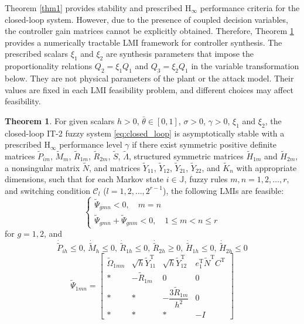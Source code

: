 \documentclass[preprint,review,fleqn,sort&compress,3p]{elsarticle}
\theoremstyle{definition} %
\theoremstyle{definition}%
\newtheorem{thm}{Theorem}[section]
\begin{document}
Theorem \ref{thm1} provides stability and prescribed $\mathrm{H}_{\infty}$ performance criteria for the closed-loop system.
However, due to the presence of coupled decision variables, the controller gain matrices cannot be explicitly obtained. Therefore, Theorem \ref{thm2} provides a numerically tractable LMI framework for controller synthesis.
The prescribed scalars $\xi_1$ and $\xi_2$ are synthesis parameters that impose the proportionality relations $Q_2=\xi_1Q_1$ and $Q_3=\xi_2Q_1$ in the variable transformation below. They are not physical parameters of the plant or the attack model. Their values are fixed in each LMI feasibility problem, and different choices may affect feasibility.
\begin{thm}\label{thm2}
 For given scalars $h > 0$, $\bar{\theta} \in [0,1]$, $\sigma > 0$, $\gamma > 0$, $\xi_1$ and $\xi_2$, the closed-loop IT-2 fuzzy system \eqref{eq:closed_loop} is asymptotically stable with a prescribed $\mathrm{H}_\infty$ performance level $\gamma$ if there exist symmetric positive definite matrices $\tilde{P}_{im}$, $\tilde{M}_{m}$, $\tilde{R}_{1m}$, $\tilde{R}_{2m}$, $\tilde{S}$, $\tilde{\Lambda}$, structured symmetric matrices $\tilde{H}_{1m}$ and $\tilde{H}_{2m}$, a nonsingular matrix $\tilde{N}$, and matrices $\tilde{Y}_{11}$, $\tilde{Y}_{12}$, $\tilde{Y}_{21}$, $\tilde{Y}_{22}$, and $\widetilde{K}_n$ with appropriate dimensions, such that for each Markov state $i \in \mathbb{J}$, fuzzy rules $m,n = 1,2,\ldots,r$, and switching condition $\mathcal{C}_l$ ($l = 1,2,\ldots,2^{r-1}$), the following LMIs are feasible:
	\begin{equation}\label{shucr1_not}
		\begin{cases}
			\widetilde{\Psi}_{gmn} < 0 	,\quad  m=n  \\
			\widetilde{\Psi}_{gmn} + \widetilde{\Psi}_{gnm} < 0,\quad 1 \le m 	< n \le r
		\end{cases}
	\end{equation}
	for $g=1,2$, and
	\begin{equation}\label{dot_hat_small_0}
	\dot{\widetilde{P}}_{ih} \leq 0, \, 
	\dot{\widetilde{M}}_{h} \leq 0, \, 
	\dot{\widetilde{R}}_{1h} \leq 0, \, 
	\dot{\widetilde{R}}_{2h} \geq 0, \, 
	\dot{\widetilde{H}}_{1h} \leq 0, \, 
	\dot{\widetilde{H}}_{2h} \leq 0
	\end{equation}
\begin{equation}\label{LMI1_not}
\widetilde{\Psi}_{1mn} =
\begin{bmatrix}
	\widetilde{\Omega}_{1mn} & \sqrt{h} \widetilde{Y}_{11}^{\mathrm{T}} & \sqrt{h} \widetilde{Y}_{12}^{\mathrm{T}} & e_1^{\mathrm{T}} \widetilde{N}^{\mathrm{T}} {C}^{\mathrm{T}}\\[1.5ex]
	* & -\widetilde{R}_{1m} & 0 & 0 \\[1.5ex]
	* & * & -\dfrac{3\widetilde{R}_{1m}}{h^2} & 0\\[1.5ex]
	* & * & * & -I
\end{bmatrix}
\end{equation}


\end{thm}
\end{document}
